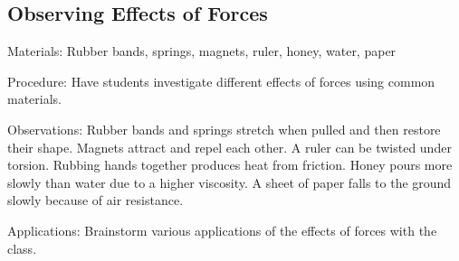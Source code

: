 \begin{multicols}{2}
\subsection{Observing Effects of Forces}
\begin{description*}
\item[Materials:]{Rubber bands, springs, magnets, ruler, honey, water, paper}
\item[Procedure:]{Have students investigate different effects of forces using common materials.}
\item[Observations:]{Rubber bands and springs stretch when pulled and then restore their shape. Magnets attract and repel each other. A ruler can be twisted under torsion. Rubbing hands together produces heat from friction. Honey pours more slowly than water due to a higher viscosity. A sheet of paper falls to the ground slowly because of air resistance.}
\item[Applications:]{Brainstorm various applications of the effects of forces with the class.}
\end{description*}


\end{multicols}

